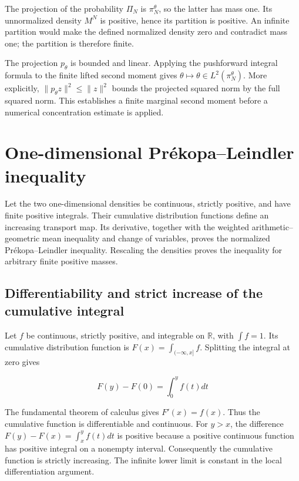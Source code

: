 \documentclass[11pt,a4paper]{article}
\begin{document}
The projection of the probability \(\Pi_N\) is \(\pi_N^\theta\), so the latter has mass one. Its unnormalized density \(M^N\) is positive, hence its partition is positive. An infinite partition would make the defined normalized density zero and contradict mass one; the partition is therefore finite.



The projection \(p_\theta\) is bounded and linear. Applying the pushforward integral formula to the finite lifted second moment gives \(\theta\mapsto\theta\in L^2(\pi_N^\theta)\). More explicitly, \(\|p_\theta z\|^2\le\|z\|^2\) bounds the projected squared norm by the full squared norm. This establishes a finite marginal second moment before a numerical concentration estimate is applied.



\section{\texorpdfstring{One-dimensional Prékopa–Leindler inequality}{One-dimensional Prékopa–Leindler inequality}}


Let the two one-dimensional densities be continuous, strictly positive, and have finite positive integrals. Their cumulative distribution functions define an increasing transport map. Its derivative, together with the weighted arithmetic–geometric mean inequality and change of variables, proves the normalized Prékopa–Leindler inequality. Rescaling the densities proves the inequality for arbitrary finite positive masses.


\subsection{\texorpdfstring{Differentiability and strict increase of the cumulative integral}{Differentiability and strict increase of the cumulative integral}}


Let \(f\) be continuous, strictly positive, and integrable on \(\mathbb R\), with \(\int f=1\). Its cumulative distribution function is \(F(x)=\int_{(-\infty,x]}f\). Splitting the integral at zero gives

\[F(y)-F(0)=\int_0^y f(t)dt\]

The fundamental theorem of calculus gives \(F'(x)=f(x)\). Thus the cumulative function is differentiable and continuous. For \(y>x\), the difference \(F(y)-F(x)=\int_x^y f(t)dt\) is positive because a positive continuous function has positive integral on a nonempty interval. Consequently the cumulative function is strictly increasing. The infinite lower limit is constant in the local differentiation argument.
\end{document}
